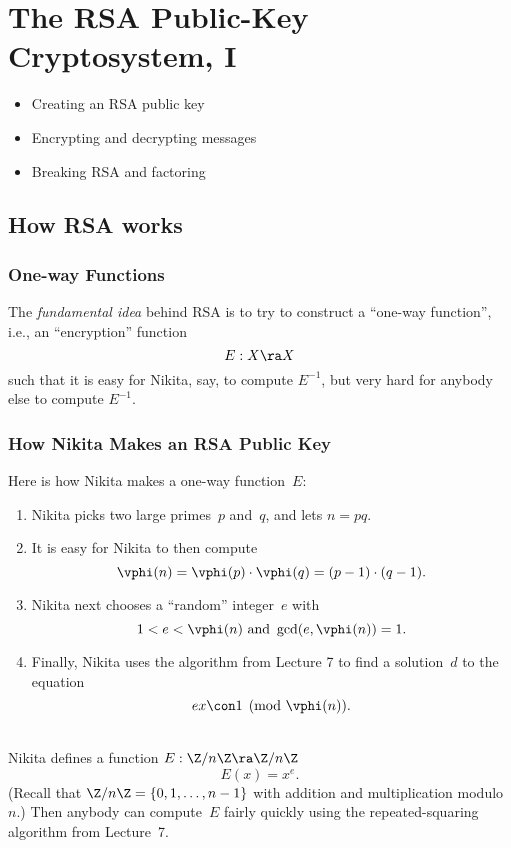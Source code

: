 \documentclass[11pt]{report}
\begin{document}
\chapter{The RSA Public-Key Cryptosystem, I}


\begin{itemize}
  \item Creating an RSA public key
  \item Encrypting and decrypting messages
  \item Breaking RSA and factoring
\end{itemize}

\tableofcontents
\section{How RSA works}
\subsection{One-way Functions}
The {\em fundamental idea} behind RSA is to try to construct
a ``one-way function'', i.e., an ``encryption'' function
$$
  E : X \ra X
$$
such that it is easy for Nikita, say, to compute $E^{-1}$, but very
hard for anybody else to compute $E^{-1}$.

\subsection{How Nikita Makes an RSA Public Key}
Here is how Nikita makes a one-way function~$E$:
\begin{enumerate}
  \item Nikita picks two large primes~$p$ and~$q$, and lets $n=pq$.
  \item It is easy for Nikita to then compute
        $$
          \vphi(n) = \vphi(p)\cdot \vphi(q) = (p-1)\cdot (q-1).
        $$
  \item Nikita next chooses a ``random'' integer~$e$ with
        $$
          1<e<\vphi(n)\text{ and }
          \gcd(e,\vphi(n))=1.
        $$

  \item Finally, Nikita uses the algorithm from Lecture 7 to find a
        solution~$d$ to the equation
        $$
          ex \con 1\pmod{\vphi(n)}.
        $$
\end{enumerate}

\\
Nikita defines a function $E:\Z/n\Z \ra \Z/n\Z$
$$
  E(x) = x^e.
$$
(Recall that $\Z/n\Z = \{0,1,\ldots,n-1\}$ with addition and multiplication
modulo~$n$.)
Then anybody can compute~$E$ fairly quickly using the repeated-squaring
algorithm from Lecture~7.
\end{document}
